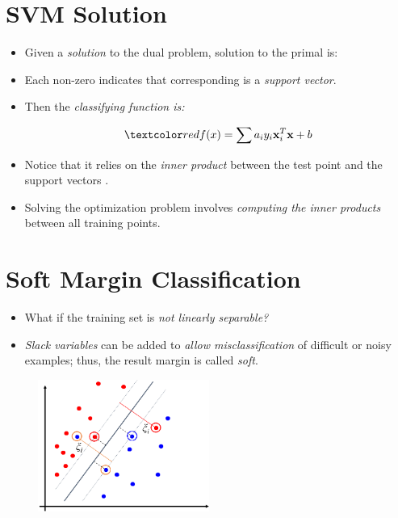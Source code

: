 \documentclass[
	number={2},
	title={Learning Linear Separators{,} SVMs and Kernels}
]{cs584notes}
\begin{document}
\section{SVM Solution}\label{sec:svm-solution}
\begin{itemize}
	\item Given a \emph{solution}  to the dual problem, solution to the primal is:
	\begin{svmbox}
		\data{\[ \vec{w} = \sum a_{i}y_{i}\vec{x}\ \ \ b = y_{k} - \sum a_{i}y_{i}\vec{x}_{i}^{T}\vec{x}_{k} \mbox{ for any } a_{k} > 0  \]}
	\end{svmbox}
	\item Each non-zero  indicates that corresponding  is a \emph{support vector}.
	\item Then the \emph{classifying function is:}
	\begin{svmbox}
		\[ \data{ f(x) = \sum a_{i}y_{i}\vec{x}_{i}^{T}\vec{x} + b } \]
	\end{svmbox}
	\item Notice that it relies on the \emph{inner product} between the test point  and the support vectors .
	\item Solving the optimization problem involves \emph{computing the inner products}  between all training points.
\end{itemize}

\section{Soft Margin Classification}\label{sec:soft-margin-classification}
\begin{itemize}
	\item What if the training set is \emph{not linearly separable?}
	\item \emph{Slack variables}  can be added to \emph{allow misclassification} of difficult or noisy examples; thus, the result margin is called \emph{soft}.
\end{itemize}
\begin{figure}[H]
	\centering
	\includegraphics[width=0.5\textwidth]{figures/2/soft_margin_classification}
	\caption{}
	\label{fig:soft-margin-classification}
\end{figure}
\end{document}
